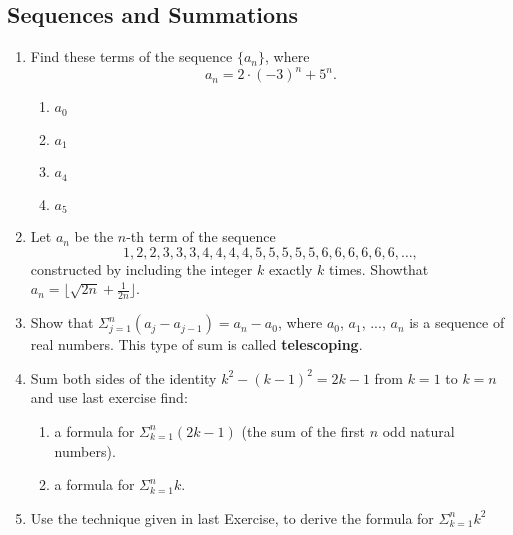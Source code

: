 \documentclass{../../cls/sig-alternate-05-2015}
\begin{document}
\subsection{Sequences and Summations}
\begin{enumerate}
\item Find these terms of the sequence $\{a_n\}$, where \begin{equation}
	a_n = 2 \cdot (-3)^n + 5^n.
\end{equation}\begin{enumerate}
	\item $a_0$
	\item $a_1$
	\item $a_4$
	\item $a_5$
\end{enumerate}

\item Let $a_n$ be the $n$-th term of the sequence \begin{equation}
	1, 2, 2, 3, 3, 3, 4, 4, 4, 4, 5, 5, 5, 5, 5, 6, 6, 6, 6, 6, 6, \ldots,
\end{equation} constructed by including the integer $k$ exactly $k$ times. Showthat $a_n = \lfloor \sqrt{2n}+ \frac{1}{2n} \rfloor$.

\item Show that $\Sigma^n_{j = 1}(a_j - a_{j - 1}) = a_n - a_0$, where
$a_0$, $a_1$, ..., $a_n$ is a sequence of real numbers. This type of sum is called \textbf{telescoping}.

\item Sum both sides of the identity $k^2 - (k - 1)^2 = 2k - 1$ from $k = 1$ to $k = n$ and use last exercise find:
\begin{enumerate}
	\item a formula for $\Sigma^n_{k = 1}(2k - 1)$ (the sum of the first $n$ odd natural numbers).
	\item a formula for $\Sigma^n_{k = 1} k$.
\end{enumerate}

\item Use the technique given in last Exercise, to derive the formula for $\Sigma^n_{k = 1} k^2$

\end{enumerate}
\end{document}
